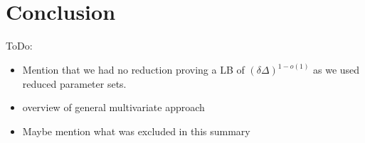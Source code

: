 \section{Conclusion}

ToDo:
\begin{itemize}
\item Mention that we had no reduction proving a LB of $(\delta\Delta)^{1-o(1)}$ as we used reduced parameter sets.
\item overview of general multivariate approach
\item Maybe mention what was excluded in this summary
\end{itemize}